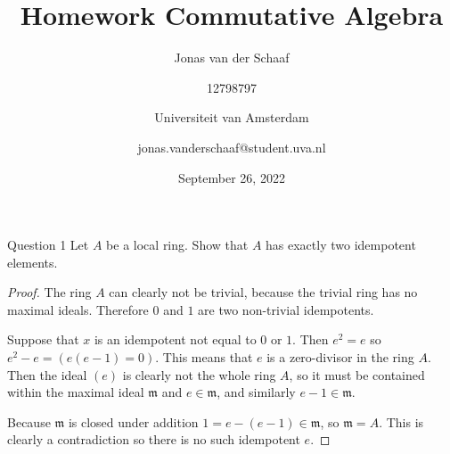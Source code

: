 \documentclass{article}
\title{Homework Commutative Algebra}
\author{Jonas van der Schaaf \and 12798797 \and Universiteit van Amsterdam \and jonas.vanderschaaf@student.uva.nl}
\date{September 26, 2022}
\newcommand{\maxid}{\mathfrak{m}}
\newenvironment{question}[1][]{\begin{paragraph}{Question #1}}{\end{paragraph}}
\theoremstyle{definition}
\begin{document}
\maketitle

\begin{question}[1]
    Let \(A\) be a local ring. Show that \(A\) has exactly two idempotent
    elements.

    \begin{proof}
        The ring \(A\) can clearly not be trivial, because the trivial ring has
        no maximal ideals. Therefore \(0\) and \(1\) are two non-trivial
        idempotents.

        Suppose that \(x\) is an idempotent not equal to \(0\) or \(1\). Then
        \(e^{2}=e\) so \(e^{2}-e=(e(e-1)=0)\). This means that \(e\) is a
        zero-divisor in the ring \(A\). Then the ideal \((e)\) is clearly not
        the whole ring \(A\), so it must be contained within the maximal ideal
        \(\maxid\) and \(e\in\maxid\), and similarly \(e-1\in\maxid\).

        Because \(\maxid\) is closed under addition \(1=e-(e-1)\in\maxid\), so
        \(\maxid=A\). This is clearly a contradiction so there is no such
        idempotent \(e\).
    \end{proof}
\end{question}
\end{document}

